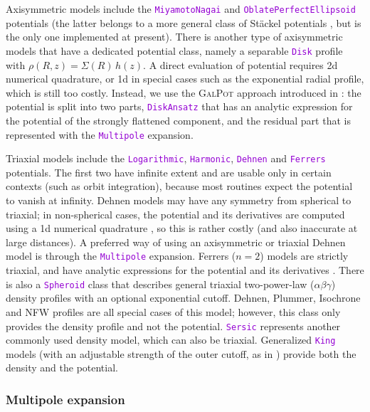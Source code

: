 \documentclass[12pt]{article}
\newcommand{\ttt}[1]{\textcolor{darkviolet}{\texttt{#1}}}
\begin{document}
Axisymmetric models include the \ttt{MiyamotoNagai} and \ttt{OblatePerfectEllipsoid} potentials (the latter belongs to a more general class of St\"ackel potentials \cite{deZeeuw1985}, but is the only one implemented at present).
There is another type of axisymmetric models that have a dedicated potential class, namely a separable \ttt{Disk} profile with $\rho(R,z) = \Sigma(R)\, h(z)$. A direct evaluation of potential requires 2d numerical quadrature, or 1d in special cases such as the exponential radial profile, which is still too costly. Instead, we use the \textsc{GalPot} approach introduced in \cite{KuijkenDubinski1995, DehnenBinney1998}: the potential is split into two parts, \ttt{DiskAnsatz} that has an analytic expression for the potential of the strongly flattened component, and the residual part that is represented with the \ttt{Multipole} expansion.

Triaxial models include the \ttt{Logarithmic}, \ttt{Harmonic}, \ttt{Dehnen} \cite{Dehnen1993} and \ttt{Ferrers} potentials. The first two have infinite extent and are usable only in certain contexts (such as orbit integration), because most routines expect the potential to vanish at infinity.
Dehnen models may have any symmetry from spherical to triaxial; in non-spherical cases, the potential and its derivatives are computed using a 1d numerical quadrature \cite{MerrittFridman1996}, so this is rather costly (and also inaccurate at large distances). A preferred way of using an axisymmetric or triaxial Dehnen model is through the \ttt{Multipole} expansion. Ferrers ($n=2$) models are strictly triaxial, and have analytic expressions for the potential and its derivatives \cite{Pfenniger1984}.
There is also a \ttt{Spheroid} class that describes general triaxial two-power-law ($\alpha\beta\gamma$) density profiles \cite{Zhao1996} with an optional exponential cutoff. Dehnen, Plummer, Isochrone and NFW profiles are all special cases of this model; however, this class only provides the density profile and not the potential. \ttt{Sersic} represents another commonly used density model, which can also be triaxial. 
Generalized \ttt{King} models (with an adjustable strength of the outer cutoff, as in \cite{GielesZocchi2015}) provide both the density and the potential.

\subsubsection{Multipole expansion}  \label{sec:PotentialMultipole}
\end{document}

